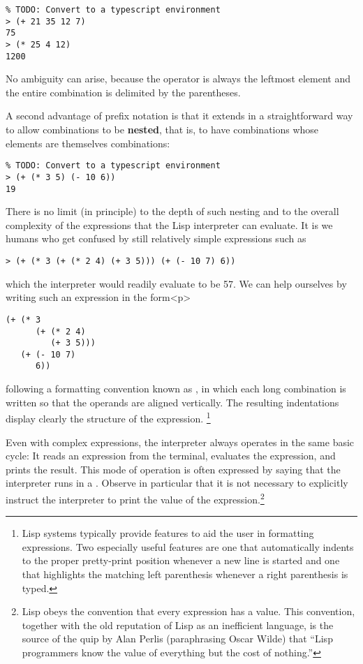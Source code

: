 \begin{verbatim}
% TODO: Convert to a typescript environment
> (+ 21 35 12 7)
75
> (* 25 4 12)
1200
\end{verbatim}

No ambiguity can arise, because the operator is always the leftmost
element and the entire combination is delimited by the parentheses.

A second advantage of prefix notation is that it extends in a
straightforward way to allow combinations to be \textbf{nested}, that
is, to have combinations whose elements are themselves
combinations:

\begin{verbatim}
% TODO: Convert to a typescript environment
> (+ (* 3 5) (- 10 6))
19
\end{verbatim}

There is no limit (in principle) to the depth of such nesting and to
the overall complexity of the expressions that the Lisp interpreter
can evaluate.  It is we humans who get confused by still relatively
simple expressions such as

\begin{verbatim}
> (+ (* 3 (+ (* 2 4) (+ 3 5))) (+ (- 10 7) 6))
\end{verbatim}

\noindent which the interpreter would readily evaluate to be 57.  We can help
ourselves by writing such an expression in the form<p>

\begin{verbatim}
(+ (* 3
      (+ (* 2 4)
         (+ 3 5)))
   (+ (- 10 7)
      6))
\end{verbatim}

\noindent following a formatting convention known as
, in which each long combination is written so
that the operands are aligned vertically.  The resulting indentations
display clearly the structure of the expression. \footnote{Lisp
  systems typically provide features to aid the user in formatting
  expressions.  Two especially useful features are one that
  automatically indents to the proper pretty-print position whenever a
  new line is started and one that highlights the matching left
  parenthesis whenever a right parenthesis is typed.}

Even with complex expressions, the interpreter always operates in the
same basic cycle: It reads an expression from the terminal, evaluates
the expression, and prints the result.  This mode of operation is
often expressed by saying that the interpreter runs in a
.  Observe in particular that it is not
necessary to explicitly instruct the interpreter to print the value of
the expression.\footnote{Lisp obeys the convention that every
  expression has a value. This convention, together with the old
  reputation of Lisp as an inefficient language, is the source of the
  quip by Alan Perlis (paraphrasing Oscar Wilde) that ``Lisp
  programmers know the value of everything but the cost of nothing.''}

